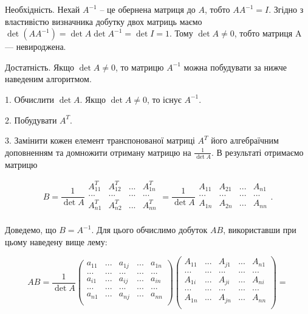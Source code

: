 Необхідність. Нехай $A^{-1}$ -- це обернена матриця до $A$, тобто $A A^{-1} = I$. Згідно
з властивістю визначника добутку двох матриць маємо
$\det(A A^{-1}) = \det A \det A^{-1} = \det I = 1$. Тому $\det A \neq 0$, тобто матриця A ---
невироджена. 


Достатність. Якщо $\det A \neq 0$, то матрицю $A^{-1}$ можна побудувати за нижче
наведеним алгоритмом.

1. Обчислити $\det A$. Якщо $\det A \neq 0$, то існує $A^{-1}$.

2. Побудувати $A^T$.

3. Замінити кожен елемент транспонованої матриці $A^T$ його алгебраїчним
доповненням та домножити отриману матрицю на $\frac{1}{\det A}$. В результаті отримаємо
матрицю

$$B = \dfrac{1}{\det A} \begin{matrix}
	A_{11}^T & A_{12}^T & ... & A_{1n}^T \\
	...      & ...      & ... & ...      \\
	A_{n1}^T & A_{n2}^T & ... & A_{nn}^T \\
\end{matrix} = \dfrac{1}{\det A} \begin{matrix}
	A_{11} & A_{21} & ... & A_{n1} \\
	...    & ...    & ... & ...    \\
	A_{1n} & A_{2n} & ... & A_{nn} \\
\end{matrix}.$$



Доведемо, що $B = A^{-1}$. Для цього обчислимо добуток $A B$, використавши при
цьому наведену вище лему:

$$AB = \dfrac{1}{\det A} \begin{pmatrix}
	a_{11} & ... & a_{1j} & ... & a_{1n} \\
	...    & ... & ...    & ... & ...    \\
	a_{i1} & ... & a_{ij} & ... & a_{in} \\
	...    & ... & ...    & ... & ...    \\
	a_{n1} & ... & a_{nj} & ... & a_{nn} \\ 
\end{pmatrix}    \begin{pmatrix}
	A_{11} & ... & A_{j1} & ... & A_{n1} \\
	...    & ... & ...    & ... & ...    \\
	A_{1i} & ... & A_{ji} & ... & A_{ni} \\
	...    & ... & ...    & ... & ...    \\
	A_{1n} & ... & A_{jn} & ... & A_{nn} \\ 
\end{pmatrix} = $$

